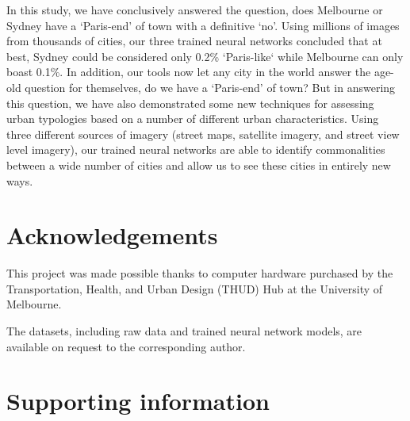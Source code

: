 \documentclass[10pt,letterpaper,hidelinks]{article}
\begin{document}
In this study, we have conclusively answered the question, does Melbourne or Sydney have a `Paris-end' of town with a definitive `no'. Using millions of images from thousands of cities, our three trained neural networks concluded that at best, Sydney could be considered only 0.2\% `Paris-like` while Melbourne can only boast 0.1\%. In addition, our tools now let any city in the world answer the age-old question for themselves, do we have a `Paris-end' of town? But in answering this question, we have also demonstrated some new techniques for assessing urban typologies based on a number of different urban characteristics. Using three different sources of imagery (street maps, satellite imagery, and street view level imagery), our trained neural networks are able to identify commonalities between a wide number of cities and allow us to see these cities in entirely new ways.  



\section*{Acknowledgements}\label{sec:acknowledgements}
This project was made possible thanks to computer hardware purchased by the Transportation, Health, and Urban Design (THUD) Hub at the University of Melbourne.

The datasets, including raw data and trained neural network models, are available on request to the corresponding author.


\nolinenumbers

%
%
% 
\begin{thebibliography}{}

% 
% 



\end{thebibliography}


\section*{Supporting information}
\end{document}
